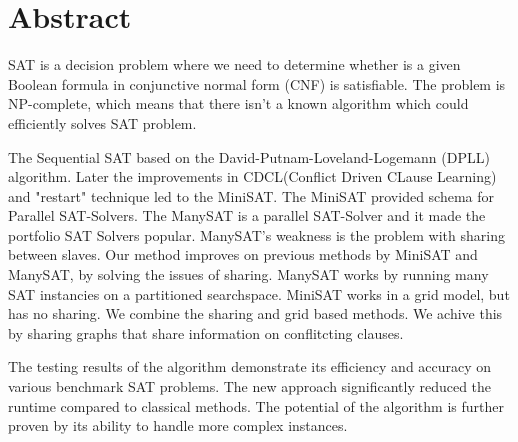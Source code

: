 \documentclass{article}
\begin{document}
\section{Abstract}
SAT is a decision problem where we need to determine whether is a given Boolean formula in conjunctive normal form (CNF) is satisfiable. The problem is NP-complete, which means that there isn’t a known algorithm which could efficiently solves SAT problem.

The Sequential SAT based on the David-Putnam-Loveland-Logemann (DPLL) algorithm. Later the improvements in CDCL(Conflict Driven CLause Learning) and "restart" technique led to the MiniSAT. The MiniSAT provided schema for Parallel SAT-Solvers. The ManySAT is a parallel SAT-Solver and it made the portfolio SAT Solvers popular. ManySAT's weakness is the problem with sharing between slaves. Our method improves on previous methods by MiniSAT and ManySAT, by solving the issues of sharing. ManySAT works by running many SAT instancies on a partitioned searchspace. MiniSAT works in a grid model, but has no sharing. We combine the sharing and grid based methods. We achive this by sharing graphs that share information on conflitcting clauses.

The testing results of the algorithm demonstrate its efficiency and accuracy on various benchmark SAT problems. The new approach significantly reduced the runtime compared to classical methods. The potential of the algorithm is further proven by its ability to handle more complex instances.
\end{document}
